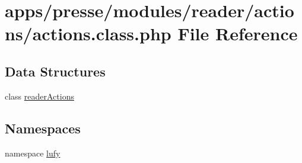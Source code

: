 \hypertarget{presse_2modules_2reader_2actions_2actions_8class_8php}{\section{apps/presse/modules/reader/actions/actions.class.\-php File Reference}
\label{presse_2modules_2reader_2actions_2actions_8class_8php}
}
\subsection*{Data Structures}
\begin{DoxyCompactItemize}
\item 
class \hyperlink{classreader_actions}{reader\-Actions}
\end{DoxyCompactItemize}
\subsection*{Namespaces}
\begin{DoxyCompactItemize}
\item 
namespace \hyperlink{namespacelufy}{lufy}
\end{DoxyCompactItemize}
